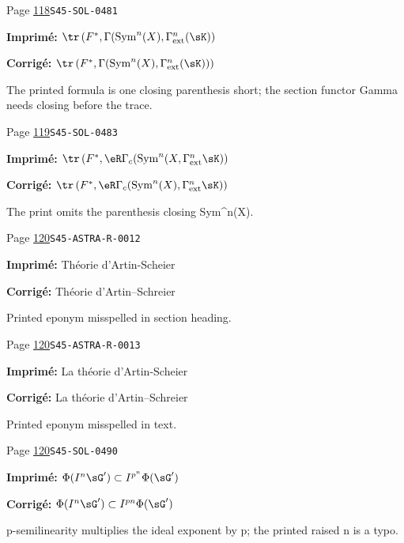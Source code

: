 \begin{description}
\smallskip
\item[\hypertarget{apparatus:FR-0075}{75}] Page \hyperlink{printpage:fr:118}{118}\quad\texttt{S45-SOL-0481}
\par\noindent\textbf{Imprimé:} \(\tr\left(F^*,\Gamma(\operatorname{Sym}^n(X),\Gamma_\text{ext}^n(\sK)\right)\)
\par\noindent\textbf{Corrigé:} \(\tr\left(F^*,\Gamma(\operatorname{Sym}^n(X),\Gamma_\text{ext}^n(\sK))\right)\)
\par\noindent The printed formula is one closing parenthesis short; the section functor Gamma needs closing before the trace.
\smallskip
\item[\hypertarget{apparatus:FR-0076}{76}] Page \hyperlink{printpage:fr:119}{119}\quad\texttt{S45-SOL-0483}
\par\noindent\textbf{Imprimé:} \(\tr\left(F^*,\eR\Gamma_c(\operatorname{Sym}^n(X,\Gamma_\text{ext}^n \sK)\right)\)
\par\noindent\textbf{Corrigé:} \(\tr\left(F^*,\eR\Gamma_c(\operatorname{Sym}^n(X),\Gamma_\text{ext}^n \sK)\right)\)
\par\noindent The print omits the parenthesis closing Sym\textasciicircum{}n(X).
\smallskip
\item[\hypertarget{apparatus:FR-0077}{77}] Page \hyperlink{printpage:fr:120}{120}\quad\texttt{S45-ASTRA-R-0012}
\par\noindent\textbf{Imprimé:} Théorie d'Artin-Scheier
\par\noindent\textbf{Corrigé:} Théorie d'Artin--Schreier
\par\noindent Printed eponym misspelled in section heading.
\smallskip
\item[\hypertarget{apparatus:FR-0078}{78}] Page \hyperlink{printpage:fr:120}{120}\quad\texttt{S45-ASTRA-R-0013}
\par\noindent\textbf{Imprimé:} La théorie d'Artin-Scheier
\par\noindent\textbf{Corrigé:} La théorie d'Artin--Schreier
\par\noindent Printed eponym misspelled in text.
\smallskip
\item[\hypertarget{apparatus:FR-0079}{79}] Page \hyperlink{printpage:fr:120}{120}\quad\texttt{S45-SOL-0490}
\par\noindent\textbf{Imprimé:} \(\Phi(I^n \sG')\subset I^{p^n}\Phi(\sG')\)
\par\noindent\textbf{Corrigé:} \(\Phi(I^n \sG')\subset I^{p n}\Phi(\sG')\)
\par\noindent p-semilinearity multiplies the ideal exponent by p; the printed raised n is a typo.

\end{description}
